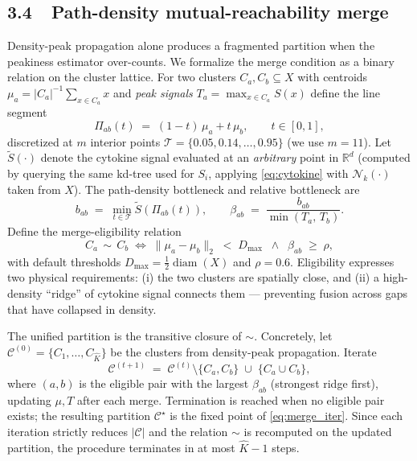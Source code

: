 
\subsection*{3.4~~Path-density mutual-reachability merge}

Density-peak propagation alone produces a fragmented partition when the
peakiness estimator over-counts. We formalize the merge condition as a
binary relation on the cluster lattice. For two clusters
$C_a, C_b \subseteq X$ with centroids
$\mu_a = |C_a|^{-1}\!\sum_{x \in C_a} x$ and \emph{peak signals}
$T_a = \max_{x \in C_a} S(x)$ define the line segment
\begin{equation}
\label{eq:line_path}
\Pi_{ab}(t) \;=\; (1-t)\,\mu_a + t\,\mu_b, \qquad t \in [0, 1],
\end{equation}
discretized at $m$ interior points
$\mathcal{T} = \{0.05, 0.14, \dots, 0.95\}$ (we use $m = 11$). Let
$\widetilde S(\cdot)$ denote the cytokine signal evaluated at an
\emph{arbitrary} point in $\mathbb{R}^d$ (computed by querying the same
kd-tree used for $S_i$, applying \eqref{eq:cytokine} with
$\mathcal{N}_k(\cdot)$ taken from $X$). The path-density bottleneck and
relative bottleneck are
\begin{equation}
\label{eq:bottleneck}
b_{ab} \;=\; \min_{t \in \mathcal{T}} \widetilde S\!\left(\Pi_{ab}(t)\right),
\qquad
\beta_{ab} \;=\; \frac{b_{ab}}{\min(T_a,\, T_b)}.
\end{equation}
Define the merge-eligibility relation
\begin{equation}
\label{eq:merge_rel}
C_a \,\sim\, C_b \;\iff\; \lVert \mu_a - \mu_b \rVert_2 \;<\; D_{\max}\;\;\wedge\;\; \beta_{ab} \;\ge\; \rho,
\end{equation}
with default thresholds $D_{\max} = \tfrac{1}{2}\operatorname{diam}(X)$
and $\rho = 0.6$. Eligibility expresses two physical requirements:
(i) the two clusters are spatially close, and (ii) a high-density
``ridge'' of cytokine signal connects them — preventing fusion across
gaps that have collapsed in density.

The unified partition is the transitive closure of $\sim$. Concretely,
let $\mathcal{C}^{(0)} = \{C_1, \dots, C_{\hat K}\}$ be the clusters from
density-peak propagation. Iterate
\begin{equation}
\label{eq:merge_iter}
\mathcal{C}^{(t+1)}
\;=\; \mathcal{C}^{(t)} \setminus \{C_a, C_b\}\;\cup\;\{C_a \cup C_b\},
\end{equation}
where $(a, b)$ is the eligible pair with the largest $\beta_{ab}$
(strongest ridge first), updating $\mu, T$ after each merge. Termination
is reached when no eligible pair exists; the resulting partition
$\mathcal{C}^{\star}$ is the fixed point of \eqref{eq:merge_iter}. Since
each iteration strictly reduces $|\mathcal{C}|$ and the relation
$\sim$ is recomputed on the updated partition, the procedure terminates
in at most $\hat K - 1$ steps.


